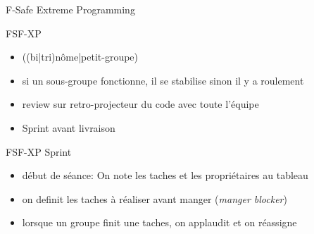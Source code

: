 {
%
\begin{frame}{F-Safe Extreme Programming}
  \begin{exampleblock}{FSF-XP}
    \begin{itemize}
    \item ((bi|tri)nôme|petit-groupe)
    \item si un sous-groupe fonctionne, il se stabilise sinon il y a roulement
    \item review sur retro-projecteur du code avec toute l'équipe
    \item Sprint avant livraison
    \end{itemize}
  \end{exampleblock}
\end{frame}
}

\begin{frame}{FSF-XP Sprint}
  \begin{itemize}
  \item début de séance: On note les taches et les propriétaires au tableau
  \item on definit les taches à réaliser avant manger (\emph{manger blocker})
  \item lorsque un groupe finit une taches, on applaudit et on réassigne
  \end{itemize}
\end{frame}


